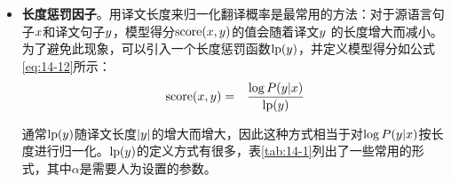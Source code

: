 \begin{itemize}
\vspace{0.5em}
\item {\small\sffamily\bfseries{长度惩罚因子}}。用译文长度来归一化翻译概率是最常用的方法：对于源语言句子${x}$和译文句子${y}$，模型得分$\textrm{score}({x},{y})$的值会随着译文${y}$ 的长度增大而减小。为了避免此现象，可以引入一个长度惩罚函数$\textrm{lp}({y})$，并定义模型得分如公式\eqref{eq:14-12}所示：
\begin{eqnarray}
\textrm{score}({x},{y}) &=& \frac{\log {P}({y}\vert{x})}{\textrm{lp}({y})}
\label{eq:14-12}
\end{eqnarray}

通常$\textrm{lp}({y})$随译文长度$\vert{y}\vert$的增大而增大，因此这种方式相当于对$\log {P}({y}\vert{x})$按长度进行归一化。$\textrm{lp}({y})$的定义方式有很多，表\ref{tab:14-1}列出了一些常用的形式，其中$\alpha$是需要人为设置的参数。


\end{itemize}

